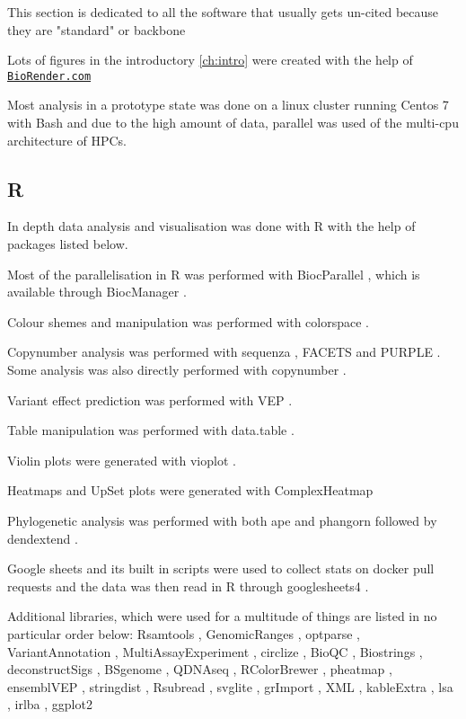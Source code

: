{This section is dedicated to all the software that usually gets un-cited because they are "standard" or backbone 

Lots of figures in the introductory \autoref{ch:intro} were created with the help of \href{https://BioRender.com}{\nolinkurl{BioRender.com}} 


Most analysis in a prototype state was done on a linux cluster running Centos 7 \cite{CentosProject2014} with Bash \cite{FSF2007} and due to the high amount of data, parallel \cite{Tange2011} was used of the multi-cpu architecture of HPCs.

\subsection*{R}
In depth data analysis and visualisation was done with R \cite{RCT2021} with the help of packages listed below.


Most of the parallelisation in R was performed with BiocParallel \cite{Morgan2020}, which is available through BiocManager \cite{Morgan2019}.

Colour shemes and manipulation was performed with colorspace \cite{Zeileis2009,Zeileis2020}.

Copynumber analysis was performed with sequenza \cite{Favero2015}, FACETS \cite{Shen2016,Seshan2018} and PURPLE \cite{Cameron2019a}. Some analysis was also directly performed with copynumber \cite{Nilsen2012,Nilsen2021}.

Variant effect prediction was performed with VEP \cite{McLaren2016}.

Table manipulation was performed with data.table \cite{Dowle2021}.

Violin plots were generated with vioplot \cite{Adler2020}.

Heatmaps and UpSet plots were generated with ComplexHeatmap \cite{Gu2016}

Phylogenetic analysis was performed with both ape \cite{Paradis2018} and phangorn \cite{Schliep2017} followed by dendextend \cite{Galili2015}.

Google sheets and its built in scripts were used to collect stats on docker pull requests and the data was then read in R through googlesheets4 \cite{Bryan2021}.

Additional libraries, which were used for a multitude of things are listed in no particular order below: Rsamtools \cite{Morgan2021}, GenomicRanges \cite{Lawrence2013}, optparse \cite{Davis2020}, VariantAnnotation \cite{Obenchain2014}, MultiAssayExperiment \cite{Ramos2017}, circlize \cite{Gu2014}, BioQC \cite{Zhang2017}, Biostrings \cite{Pages2020}, deconstructSigs \cite{Rosenthal2016}, BSgenome \cite{Pages2020a}, QDNAseq \cite{Scheinin2014}, RColorBrewer \cite{Neuwirth2014}, pheatmap \cite{Kolde2019}, ensemblVEP \cite{Obenchain2020}, stringdist \cite{vanderLoo2014}, Rsubread \cite{Liao2019}, svglite \cite{Wickham2021}, grImport \cite{Murrell2009}, XML \cite{TempleLang2020}, kableExtra \cite{Zhu2021}, lsa \cite{Wild2020}, irlba \cite{Baglama2019}, ggplot2 \cite{Wickham2016}

}
